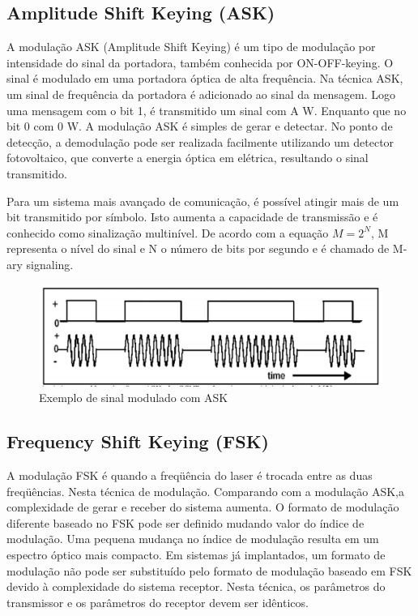 \documentclass[article]{IEEEtran}
\begin{document}
\subsection{Amplitude Shift Keying (ASK)}
\par A modulação ASK (Amplitude Shift Keying) é um tipo de modulação por intensidade do sinal da portadora, também conhecida por ON-OFF-keying. O sinal é modulado em uma portadora óptica de alta frequência. Na técnica ASK, um sinal de frequência da portadora é adicionado ao sinal da mensagem. Logo uma mensagem com o bit 1, é transmitido um sinal com A W. Enquanto que no bit 0 com 0 W. A modulação ASK é simples de gerar e detectar. No ponto de detecção, a demodulação pode ser realizada facilmente utilizando um detector fotovoltaico, que converte a energia óptica em elétrica, resultando o sinal transmitido.
\par	Para um sistema mais avançado de comunicação, é possível atingir mais de um bit transmitido por símbolo. Isto aumenta a capacidade de transmissão e é conhecido como sinalização multinível. De acordo com a equação $M = 2^N$, M representa o nível do sinal e N o número de bits por segundo e é chamado de M-ary signaling.\cite{MODULATION}
\begin{figure}[hb]
\includegraphics[width=\columnwidth]{ask.png}
\caption{Exemplo de sinal modulado com ASK}
\end{figure}

\subsection{Frequency Shift Keying (FSK)}
\par A modulação FSK é quando a freqüência do laser é trocada entre as duas freqüências. Nesta técnica de modulação. Comparando com a modulação ASK,a complexidade de gerar e receber do sistema aumenta. O formato de modulação diferente baseado no FSK pode ser definido mudando valor do índice de modulação. Uma pequena mudança no índice de modulação resulta em um espectro óptico mais compacto. Em sistemas já implantados, um formato de modulação não pode ser substituído pelo formato de modulação baseado em FSK devido à complexidade do sistema receptor. Nesta técnica, os parâmetros do transmissor e os  parâmetros do receptor devem ser idênticos.\cite{MODULATION}
\end{document}
